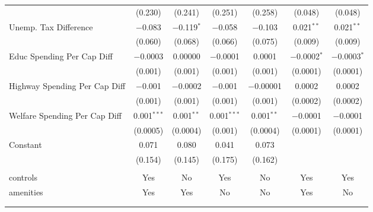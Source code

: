 \begin{table}[!htbp]
\begin{tabular}{@{\extracolsep{5pt}}lcccccc}
  & (0.230) & (0.241) & (0.251) & (0.258) & (0.048) & (0.048) \\ 
  Unemp. Tax Difference & $-$0.083 & $-$0.119$^{*}$ & $-$0.058 & $-$0.103 & 0.021$^{**}$ & 0.021$^{**}$ \\ 
  & (0.060) & (0.068) & (0.066) & (0.075) & (0.009) & (0.009) \\ 
  Educ Spending Per Cap Diff & $-$0.0003 & 0.00000 & $-$0.0001 & 0.0001 & $-$0.0002$^{*}$ & $-$0.0003$^{*}$ \\ 
  & (0.001) & (0.001) & (0.001) & (0.001) & (0.0001) & (0.0001) \\ 
  Highway Spending Per Cap Diff & $-$0.001 & $-$0.0002 & $-$0.001 & $-$0.00001 & 0.0002 & 0.0002 \\ 
  & (0.001) & (0.001) & (0.001) & (0.001) & (0.0002) & (0.0002) \\ 
  Welfare Spending Per Cap Diff & 0.001$^{***}$ & 0.001$^{**}$ & 0.001$^{***}$ & 0.001$^{**}$ & $-$0.0001 & $-$0.0001 \\ 
  & (0.0005) & (0.0004) & (0.001) & (0.0004) & (0.0001) & (0.0001) \\ 
  Constant & 0.071 & 0.080 & 0.041 & 0.073 &  &  \\ 
  & (0.154) & (0.145) & (0.175) & (0.162) &  &  \\ 
 \hline \\[-1.8ex] 
controls & Yes & No & Yes & No & Yes & Yes \\ 
amenities & Yes & Yes & No & No & Yes & No \\ 
\hline \\[-1.8ex] 
\hline 
\hline \\[-1.8ex] 
\end{tabular} 
\end{table} 
